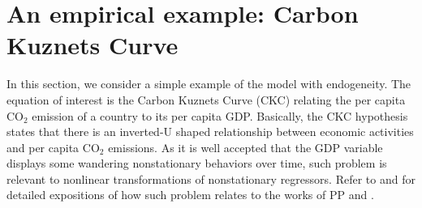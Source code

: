 


\section{An empirical example: Carbon Kuznets Curve} 

In this section, we consider a simple example of the model with endogeneity. The equation of interest is the Carbon Kuznets Curve (CKC) relating the per capita CO$_2$ emission of a country to its per capita GDP. Basically, the CKC hypothesis states that there is an inverted-U shaped relationship between economic activities and per capita CO$_2$ emissions. As it is well accepted that the GDP variable displays some wandering nonstationary behaviors over time, such problem is relevant to nonlinear transformations of nonstationary regressors. Refer to \cite{wagner2008} and \cite{mullerwagner2007} for detailed expositions of how such problem relates to the works of PP and \cite{changparkphillips2001}.

